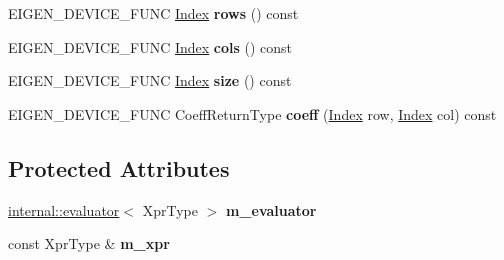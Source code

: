 \begin{DoxyCompactItemize}
\item 
\mbox{\label{class_eigen_1_1internal_1_1visitor__evaluator_ac7c271a469132b85dfb9028d021ca892}} 
E\+I\+G\+E\+N\+\_\+\+D\+E\+V\+I\+C\+E\+\_\+\+F\+U\+NC \hyperlink{namespace_eigen_a62e77e0933482dafde8fe197d9a2cfde}{Index} {\bfseries rows} () const
\item 
\mbox{\label{class_eigen_1_1internal_1_1visitor__evaluator_a0fd477b31b38a52ce7fa858e6f744c5d}} 
E\+I\+G\+E\+N\+\_\+\+D\+E\+V\+I\+C\+E\+\_\+\+F\+U\+NC \hyperlink{namespace_eigen_a62e77e0933482dafde8fe197d9a2cfde}{Index} {\bfseries cols} () const
\item 
\mbox{\label{class_eigen_1_1internal_1_1visitor__evaluator_a6dd9ece79764a4efc19b33cbf22f6528}} 
E\+I\+G\+E\+N\+\_\+\+D\+E\+V\+I\+C\+E\+\_\+\+F\+U\+NC \hyperlink{namespace_eigen_a62e77e0933482dafde8fe197d9a2cfde}{Index} {\bfseries size} () const
\item 
\mbox{\label{class_eigen_1_1internal_1_1visitor__evaluator_ac46afdb69f8a6b864b619cd2028ba7e5}} 
E\+I\+G\+E\+N\+\_\+\+D\+E\+V\+I\+C\+E\+\_\+\+F\+U\+NC Coeff\+Return\+Type {\bfseries coeff} (\hyperlink{namespace_eigen_a62e77e0933482dafde8fe197d9a2cfde}{Index} row, \hyperlink{namespace_eigen_a62e77e0933482dafde8fe197d9a2cfde}{Index} col) const
\end{DoxyCompactItemize}
\subsection*{Protected Attributes}
\begin{DoxyCompactItemize}
\item 
\mbox{\label{class_eigen_1_1internal_1_1visitor__evaluator_a62fbe7a8cf48b4804aa49f9c619f284b}} 
\hyperlink{struct_eigen_1_1internal_1_1evaluator}{internal\+::evaluator}$<$ Xpr\+Type $>$ {\bfseries m\+\_\+evaluator}
\item 
\mbox{\label{class_eigen_1_1internal_1_1visitor__evaluator_ac06ce7b7d5056826ae9cd585e028f4b0}} 
const Xpr\+Type \& {\bfseries m\+\_\+xpr}
\end{DoxyCompactItemize}


